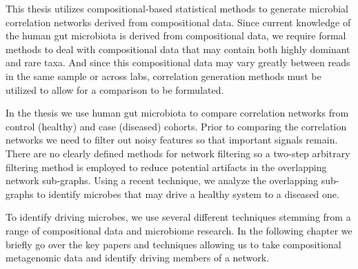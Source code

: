 This thesis utilizes compositional-based statistical methods to generate microbial correlation networks derived from compositional data. Since current knowledge of the human gut microbiota is derived from compositional data, we require formal methods to deal with compositional data that may contain both highly dominant and rare taxa. And since this compositional data may vary greatly between reads in the same sample or across labs, correlation generation methods must be utilized to allow for a comparison to be formulated. 

In the thesis we use human gut microbiota to compare correlation networks from control (healthy) and case (diseased) cohorts. Prior to comparing the correlation networks we need to filter out noisy features so that important signals remain. There are no clearly defined methods for network filtering so a two-step arbitrary filtering method is employed to reduce potential artifacts in the overlapping network sub-graphs. Using a recent technique, we analyze the overlapping sub-graphs to identify microbes that may drive a healthy system to a diseased one.

To identify driving microbes, we use several different techniques stemming from a range of compositional data and microbiome research. In the following chapter we briefly go over the key papers and techniques allowing us to take compositional metagenomic data and identify driving members of a network.

